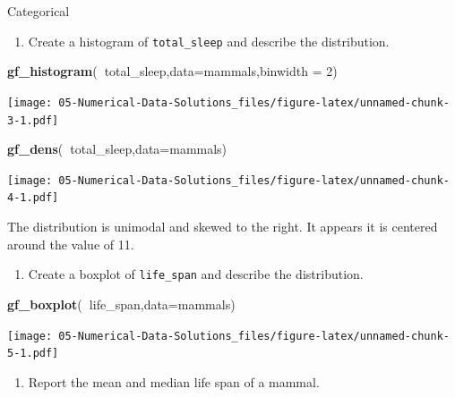 \documentclass[
]{book}
\newenvironment{Shaded}{\begin{snugshade}}{\end{snugshade}}
\newcommand{\DataTypeTok}[1]{\textcolor[rgb]{0.13,0.29,0.53}{#1}}
\newcommand{\DecValTok}[1]{\textcolor[rgb]{0.00,0.00,0.81}{#1}}
\newcommand{\KeywordTok}[1]{\textcolor[rgb]{0.13,0.29,0.53}{\textbf{#1}}}
\newcommand{\NormalTok}[1]{#1}
\newcommand{\OperatorTok}[1]{\textcolor[rgb]{0.81,0.36,0.00}{\textbf{#1}}}
\providecommand{\tightlist}{%
  \setlength{\itemsep}{0pt}\setlength{\parskip}{0pt}}
\begin{document}
Categorical

\begin{enumerate}
\def\labelenumi{\alph{enumi}.}
\setcounter{enumi}{3}
\tightlist
\item
  Create a histogram of \texttt{total\_sleep} and describe the distribution.
\end{enumerate}

\begin{Shaded}
\begin{Highlighting}[]
\KeywordTok{gf_histogram}\NormalTok{(}\OperatorTok{~}\NormalTok{total_sleep,}\DataTypeTok{data=}\NormalTok{mammals,}\DataTypeTok{binwidth =} \DecValTok{2}\NormalTok{)}
\end{Highlighting}
\end{Shaded}

\texttt{[image: 05-Numerical-Data-Solutions\_files/figure-latex/unnamed-chunk-3-1.pdf]}

\begin{Shaded}
\begin{Highlighting}[]
\KeywordTok{gf_dens}\NormalTok{(}\OperatorTok{~}\NormalTok{total_sleep,}\DataTypeTok{data=}\NormalTok{mammals)}
\end{Highlighting}
\end{Shaded}

\texttt{[image: 05-Numerical-Data-Solutions\_files/figure-latex/unnamed-chunk-4-1.pdf]}

The distribution is unimodal and skewed to the right. It appears it is centered around the value of 11.

\begin{enumerate}
\def\labelenumi{\alph{enumi}.}
\setcounter{enumi}{4}
\tightlist
\item
  Create a boxplot of \texttt{life\_span} and describe the distribution.
\end{enumerate}

\begin{Shaded}
\begin{Highlighting}[]
\KeywordTok{gf_boxplot}\NormalTok{(}\OperatorTok{~}\NormalTok{life_span,}\DataTypeTok{data=}\NormalTok{mammals)}
\end{Highlighting}
\end{Shaded}

\texttt{[image: 05-Numerical-Data-Solutions\_files/figure-latex/unnamed-chunk-5-1.pdf]}

\begin{enumerate}
\def\labelenumi{\alph{enumi}.}
\setcounter{enumi}{5}
\tightlist
\item
  Report the mean and median life span of a mammal.
\end{enumerate}
\end{document}
